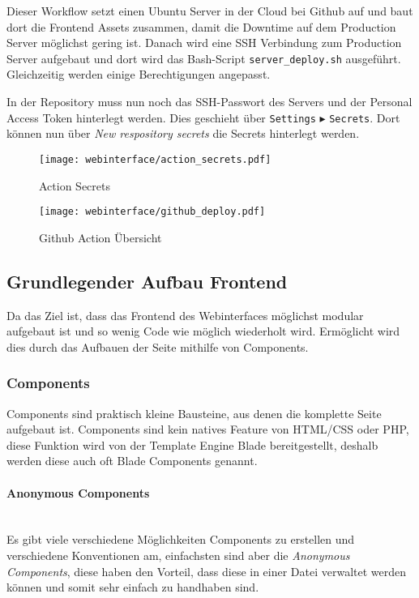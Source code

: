 Dieser Workflow setzt einen Ubuntu Server in der Cloud bei Github auf und baut
dort die Frontend Assets zusammen, damit die Downtime auf dem Production Server
möglichst gering ist. Danach wird eine SSH Verbindung zum Production Server
aufgebaut und dort wird das Bash-Script \verb|server_deploy.sh| ausgeführt.
Gleichzeitig werden einige Berechtigungen angepasst.

In der Repository muss nun noch das SSH-Passwort des Servers und der Personal Access Token
hinterlegt werden. Dies geschieht über \verb|Settings| $\blacktriangleright$
\verb|Secrets|. Dort können nun über \textit{New respository secrets} die Secrets
hinterlegt werden.

\begin{figure}[H]
  \centering
  \texttt{[image: webinterface/action\_secrets.pdf]}
  \caption{Action Secrets}
\end{figure}

\begin{figure}[H]
  \centering
  \texttt{[image: webinterface/github\_deploy.pdf]}
  \caption{Github Action Übersicht}
\end{figure}


\subsection{Grundlegender Aufbau Frontend}

Da das Ziel ist, dass das Frontend des Webinterfaces möglichst modular aufgebaut ist
und so wenig Code wie möglich wiederholt wird. Ermöglicht wird dies durch das
Aufbauen der Seite mithilfe von Components.


\subsubsection{Components}

Components sind praktisch kleine Bausteine, aus denen die komplette Seite
aufgebaut ist. Components sind kein natives Feature von HTML/CSS oder PHP, diese
Funktion wird von der Template Engine Blade bereitgestellt, deshalb werden diese
auch oft Blade Components genannt. 

\paragraph{Anonymous Components}\mbox{}\\

Es gibt viele verschiedene Möglichkeiten Components zu erstellen und
verschiedene Konventionen am, einfachsten sind aber die \textit{Anonymous Components}, 
diese haben den Vorteil, dass diese in einer Datei verwaltet werden
können und somit sehr einfach zu handhaben sind.

